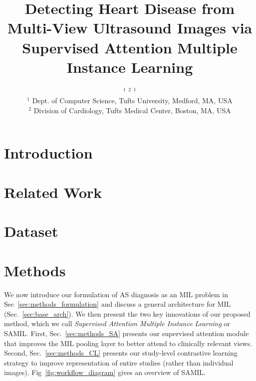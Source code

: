 \documentclass[pmlr]{jmlr}%
\title[Detecting Heart Disease from Multi-View Ultrasound via SAMIL]{Detecting Heart Disease from Multi-View Ultrasound Images via Supervised Attention Multiple Instance Learning}
\author{\Name{Zhe Huang}$^{1}$
		\Email{\textsc{zhe.huang@tufts.edu}}
\AND
        \Name{Benjamin S. Wessler}$^{2}$
		\Email{\textsc{bwessler@tuftsmedicalcenter.org}}
\AND       
        \Name{Michael C. Hughes}$^1$
        \Email{\textsc{michael.hughes@tufts.edu}}
        \\
        \addr $^1$ Dept. of Computer Science, Tufts University, Medford, MA, USA
        \\
        \addr $^2$ Division of Cardiology, Tufts Medical Center, Boston, MA, USA
}%
\begin{document}
\setlength{\abovedisplayskip}{2pt plus 3pt}
\setlength{\belowdisplayskip}{2pt plus 3pt}

\maketitle

\begin{abstract}
  
\end{abstract}
\let\thefootnote\relax{}

\startcontents[sections]

\section{Introduction}
\label{sec:Introduction}



\section{Related Work}
\label{sec:RelatedWork}


\section{Dataset}
\label{sec:Dataset}



\section{Methods}
We now introduce our formulation of AS diagnosis as an MIL problem in Sec~\ref{sec:methods_formulation} and
discuss a general architecture for MIL (Sec.~\ref{sec:base_arch}).
We then present the two key innovations of our proposed method, which we call \emph{Supervised Attention Multiple Instance Learning} or SAMIL.
First, Sec.~\ref{sec:methods_SA} presents our supervised attention module that improves the MIL pooling layer to better attend to clinically relevant views.
Second, Sec.~\ref{sec:methods_CL} presents our study-level contrastive learning strategy to improve representation of entire studies (rather than individual images). Fig~\ref{fig:workflow_diagram} gives an overview of SAMIL.
\end{document}
